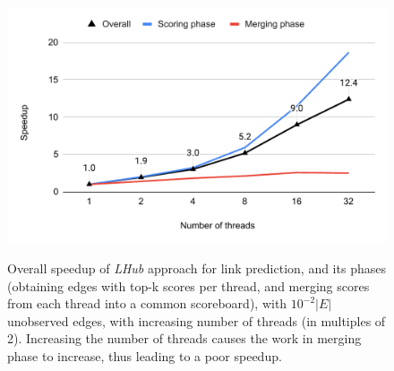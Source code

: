 \begin{figure}[hbtp]
  \centering
  \includegraphics[width=0.98\linewidth]{out/strong-scaling-speedup.pdf} \\[-2ex]
  \caption{Overall speedup of \textit{LHub} approach for link prediction, and its phases (obtaining edges with top-k scores per thread, and merging scores from each thread into a common scoreboard), with $10^{-2}|E|$ unobserved edges, with increasing number of threads (in multiples of 2). Increasing the number of threads causes the work in merging phase to increase, thus leading to a poor speedup.}
  \label{fig:strong-scaling}
\end{figure}
